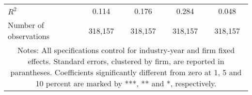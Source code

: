 \begin{tabular}{lcccc}
\\
	$R^2$ 
				& 0.114 
				& 0.176 
				& 0.284 
				& 0.048 \\
	Number of observations 
				& 318,157 
				& 318,157 
				& 318,157 
				& 318,157 \\
\hline \hline
\multicolumn{ 5 }{c}{\begin{minipage}{\textwidth}
\small Notes: All specifications control for industry-year and firm fixed effects. Standard errors, clustered by firm, are reported in parantheses. Coefficients significantly different from zero at 1, 5 and 10 percent are marked by ***, ** and *, respectively.

  \end{minipage} } \\
\end{tabular}